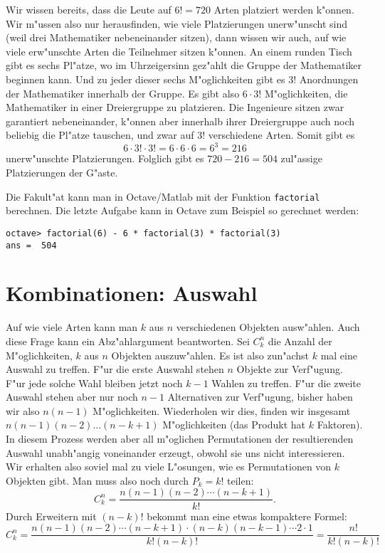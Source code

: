 \begin{beispiele}
\begin{loesung}
\begin{teilaufgaben}
Wir wissen bereits, dass die Leute auf $6!=720$ Arten platziert werden
k"onnen.
Wir m"ussen also nur herausfinden, wie viele Platzierungen
unerw"unscht sind (weil drei Mathematiker nebeneinander sitzen),
dann wissen wir auch, auf wie viele erw"unschte Arten die Teilnehmer
sitzen k"onnen.
An einem runden Tisch gibt es sechs Pl"atze, wo im Uhrzeigersinn gez"ahlt 
die Gruppe der Mathematiker beginnen kann.
Und zu jeder dieser
sechs M"oglichkeiten gibt es $3!$ Anordnungen der Mathematiker innerhalb
der Gruppe.
Es gibt also $6 \cdot 3!$ M"oglichkeiten, die Mathematiker
in einer Dreiergruppe zu platzieren.
Die Ingenieure sitzen zwar garantiert nebeneinander, k"onnen aber
innerhalb ihrer Dreiergruppe auch noch beliebig die Pl"atze
tauschen, und zwar auf $3!$ verschiedene Arten.
Somit gibt es
\[
6\cdot 3!\cdot 3!=6\cdot 6\cdot 6=6^3=216
\]
unerw"unschte Platzierungen.
Folglich gibt es $720-216=504$ zul"assige
Platzierungen der G"aste.
\end{teilaufgaben}
\end{loesung}

\end{beispiele}

Die Fakult"at kann man in Octave/Matlab mit der Funktion {\tt factorial}
berechnen.
Die letzte Aufgabe kann in Octave zum Beispiel so gerechnet
werden:
\begin{verbatim}
octave> factorial(6) - 6 * factorial(3) * factorial(3)
ans =  504
\end{verbatim}

\section{Kombinationen: Auswahl}
Auf wie viele Arten kann man $k$ aus $n$ verschiedenen Objekten
ausw"ahlen.
Auch diese Frage kann ein Abz"ahlargument
beantworten.
Sei $C^n_k$ die Anzahl der M"oglichkeiten,
$k$ aus $n$ Objekten auszuw"ahlen.
Es ist also zun"achst
$k$ mal eine Auswahl zu treffen.
F"ur die erste Auswahl stehen $n$ Objekte zur Verf"ugung.
F"ur jede solche Wahl bleiben jetzt noch $k-1$ Wahlen zu treffen.
F"ur die zweite
Auswahl stehen aber nur noch $n-1$ Alternativen zur Verf"ugung,
bisher haben wir also $n(n-1)$ M"oglichkeiten.
Wiederholen wir
dies, finden wir insgesamt $n(n-1)(n-2)\dots(n-k+1)$ M"oglichkeiten
(das Produkt hat $k$ Faktoren).
In diesem Prozess werden
aber all m"oglichen Permutationen der resultierenden Auswahl
unabh"angig voneinander erzeugt, obwohl sie uns nicht
interessieren.
Wir erhalten also soviel mal zu viele L"osungen, wie
es Permutationen von $k$ Objekten gibt.
Man muss also noch durch
$P_k=k!$ teilen:
\[
C^n_k=\frac{n(n-1)(n-2)\dotsm(n-k+1)}{k!}.
\]
Durch Erweitern mit $(n-k)!$ bekommt man eine etwas
kompaktere Formel:
\[
C^n_k=\frac{n(n-1)(n-2)\dotsm(n-k+1)\cdot(n-k)(n-k-1)\dotsm2\cdot 1}{k!(n-k)!}
=\frac{n!}{k!(n-k)!}
\]

